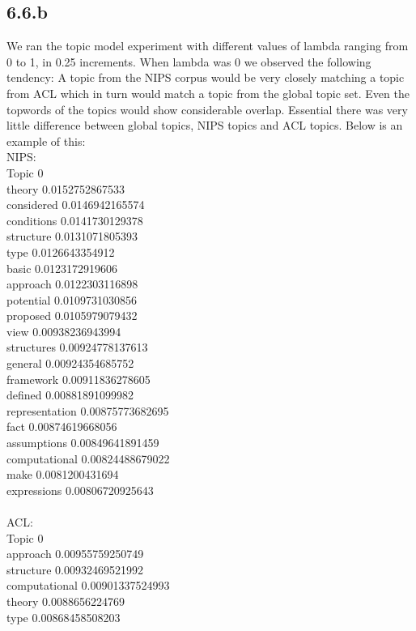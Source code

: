 \documentclass{article}
\begin{document}
{\subsection*{6.6.b}
We ran the topic model experiment with different values of lambda ranging from 0 to 1, in 0.25 increments.
When lambda was 0 we observed the following tendency:
A topic from the NIPS corpus would be very closely matching a topic from ACL which in turn would match a topic from the global topic set.
Even the topwords of the topics would show considerable overlap. Essential there was very little difference between global topics, NIPS
topics and ACL topics. Below is an example of this:\\
NIPS:\\
Topic 0\\
theory 0.0152752867533\\
considered 0.0146942165574\\
conditions 0.0141730129378\\
structure 0.0131071805393\\
type 0.0126643354912\\
basic 0.0123172919606\\
approach 0.0122303116898\\
potential 0.0109731030856\\
proposed 0.0105979079432\\
view 0.00938236943994\\
structures 0.00924778137613\\
general 0.00924354685752\\
framework 0.00911836278605\\
defined 0.00881891099982\\
representation 0.00875773682695\\
fact 0.00874619668056\\
assumptions 0.00849641891459\\
computational 0.00824488679022\\
make 0.0081200431694\\
expressions 0.00806720925643\\
\\
ACL:\\
Topic 0\\
approach 0.00955759250749\\
structure 0.00932469521992\\
computational 0.00901337524993\\
theory 0.0088656224769\\
type 0.00868458508203\\
}
\end{document}

